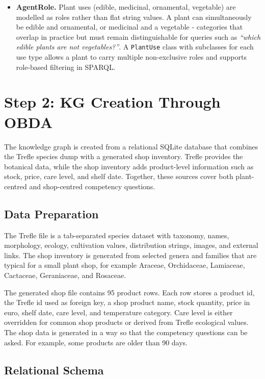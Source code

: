 \documentclass[11pt,a4paper]{article}
\begin{document}
\begin{itemize}
\item \textbf{AgentRole.}
Plant uses (edible, medicinal, ornamental, vegetable) are modelled as roles
rather than flat string values.
A plant can simultaneously be edible and ornamental, or medicinal and a
vegetable - categories that overlap in practice but must remain
distinguishable for queries such as \emph{``which edible plants are not
vegetables?''}.
A \texttt{PlantUse} class with subclasses for each use type allows a plant to
carry multiple non-exclusive roles and supports role-based filtering in SPARQL.


\end{itemize}






\section{Step 2: KG Creation Through OBDA}

The knowledge graph is created from a relational SQLite database that combines
the Trefle species dump with a generated shop inventory. Trefle provides the
botanical data, while the shop inventory adds product-level information such as
stock, price, care level, and shelf date. Together, these sources cover both
plant-centred and shop-centred competency questions.

\subsection{Data Preparation}

The Trefle file is a tab-separated species dataset with taxonomy, names,
morphology, ecology, cultivation values, distribution strings, images, and
external links. The shop inventory is generated from selected genera and
families that are typical for a small plant shop, for example Araceae,
Orchidaceae, Lamiaceae, Cactaceae, Geraniaceae, and Rosaceae.

The generated shop file contains 95 product rows. Each row stores a product id,
the Trefle id used as foreign key, a shop product name, stock quantity, price in
euro, shelf date, care level, and temperature category. Care level is either
overridden for common shop products or derived from Trefle ecological values.
The shop data is generated in a way so that the competency questions can be
asked. For example, some products are older than 90 days.

\subsection{Relational Schema}
\end{document}

